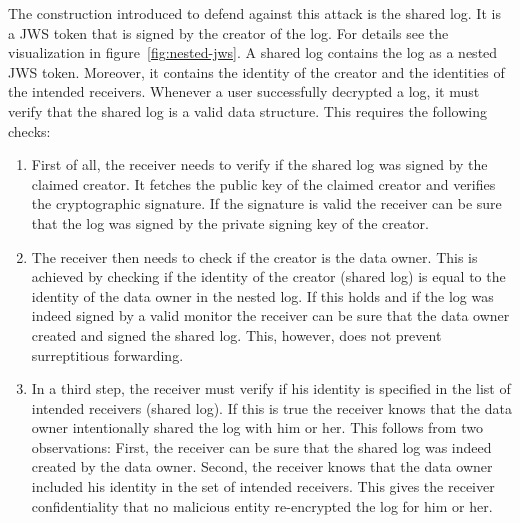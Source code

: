 \documentclass[../main.tex]{subfiles}
\begin{document}
The construction introduced to defend against this attack is the shared log.
It is a JWS token that is signed by the creator of the log.
For details see the visualization in figure~\ref{fig:nested-jws}.
A shared log contains the log as a nested JWS token.
Moreover, it contains the identity of the creator and the identities of the intended receivers.
Whenever a user successfully decrypted a log, it must verify that the shared log is a valid data structure.
This requires the following checks:
\begin{enumerate}
\item 
First of all, the receiver needs to verify if the shared log was signed by the claimed creator.
It fetches the public key of the claimed creator and verifies the cryptographic signature.
If the signature is valid the receiver can be sure that the log was signed by the private signing key of the creator.
\item 
The receiver then needs to check if the creator is the data owner. 
This is achieved by checking if the identity of the creator (shared log) is equal to the identity of the data owner in the nested log.
If this holds and if the log was indeed signed by a valid monitor the receiver can be sure that the data owner created and signed the shared log.
This, however, does not prevent surreptitious forwarding.
\item 
In a third step, the receiver must verify if his identity is specified in the list of intended receivers (shared log).
If this is true the receiver knows that the data owner intentionally shared the log with him or her.
This follows from two observations:
First, the receiver can be sure that the shared log was indeed created by the data owner.
Second, the receiver knows that the data owner included his identity in the set of intended receivers.
This gives the receiver confidentiality that no malicious entity re-encrypted the log for him or her.
\end{enumerate}
\end{document}
